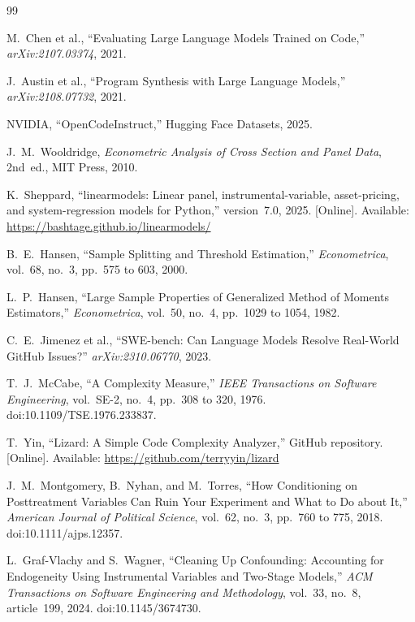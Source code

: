 \documentclass{article}
\begin{document}
\begin{thebibliography}{99}

M.~Chen et al., ``Evaluating Large Language Models Trained on Code,'' \emph{arXiv:2107.03374}, 2021.

J.~Austin et al., ``Program Synthesis with Large Language Models,'' \emph{arXiv:2108.07732}, 2021.

NVIDIA, ``OpenCodeInstruct,'' Hugging Face Datasets, 2025.

J.~M.~Wooldridge, \emph{Econometric Analysis of Cross Section and Panel Data}, 2nd~ed., MIT Press, 2010.

K.~Sheppard, ``linearmodels: Linear panel, instrumental-variable, asset-pricing, and system-regression models for Python,'' version~7.0, 2025. [Online]. Available: \url{https://bashtage.github.io/linearmodels/}

B.~E.~Hansen, ``Sample Splitting and Threshold Estimation,'' \emph{Econometrica}, vol.~68, no.~3, pp.~575 to 603, 2000.

L.~P.~Hansen, ``Large Sample Properties of Generalized Method of Moments Estimators,'' \emph{Econometrica}, vol.~50, no.~4, pp.~1029 to 1054, 1982.

C.~E.~Jimenez et al., ``SWE-bench: Can Language Models Resolve Real-World GitHub Issues?'' \emph{arXiv:2310.06770}, 2023.

T.~J.~McCabe, ``A Complexity Measure,'' \emph{IEEE Transactions on Software Engineering}, vol.~SE-2, no.~4, pp.~308 to 320, 1976. doi:10.1109/TSE.1976.233837.

T.~Yin, ``Lizard: A Simple Code Complexity Analyzer,'' GitHub repository. [Online]. Available: \url{https://github.com/terryyin/lizard}

J.~M.~Montgomery, B.~Nyhan, and M.~Torres, ``How Conditioning on Posttreatment Variables Can Ruin Your Experiment and What to Do about It,'' \emph{American Journal of Political Science}, vol.~62, no.~3, pp.~760 to 775, 2018. doi:10.1111/ajps.12357.

L.~Graf-Vlachy and S.~Wagner, ``Cleaning Up Confounding: Accounting for Endogeneity Using Instrumental Variables and Two-Stage Models,'' \emph{ACM Transactions on Software Engineering and Methodology}, vol.~33, no.~8, article~199, 2024. doi:10.1145/3674730.


\end{thebibliography}
\end{document}
